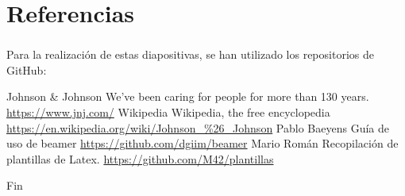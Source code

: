 \documentclass[compress, aspectratio=169]{beamer} %
\begin{document}
\section{Referencias}
	\begin{frame}
	\transdissolve[duration=1]

		\frametitle{\insertsection}
		
		Para la realización de estas diapositivas, se han utilizado los repositorios de GitHub:
		
		\footnotesize{
		\begin{thebibliography}{7} %
			 Johnson \& Johnson
				\newblock We've been caring for people for more than 130 years.
				\newblock \url{https://www.jnj.com/}
			 Wikipedia
				\newblock Wikipedia, the free encyclopedia
				\newblock \url{https://en.wikipedia.org/wiki/Johnson\_\%26\_Johnson}
			 Pablo Baeyens
				\newblock Guía de uso de beamer
				\newblock \url{https://github.com/dgiim/beamer}
			 Mario Román
				\newblock Recopilación de plantillas de Latex.
				\newblock \url{https://github.com/M42/plantillas}
		\end{thebibliography}
		}
	\end{frame}


\begin{frame}
	\transdissolve[duration=1]

\Huge{\centerline{Fin}}
\end{frame}

\end{document}
